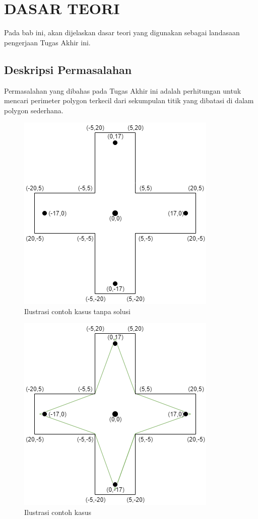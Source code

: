\chapter {DASAR TEORI}

Pada bab ini, akan dijelaskan dasar teori yang digunakan sebagai landasaan pengerjaan Tugas Akhir ini.

\section{ Deskripsi Permasalahan}
Permasalahan yang dibahas pada Tugas Akhir ini adalah perhitungan untuk mencari perimeter polygon terkecil dari sekumpulan titik yang dibatasi di dalam polygon sederhana.
\begin{figure}
	\Centering
	\includegraphics [width=0.5\columnwidth]{bab2/img/contoh-kasus-tanpa-solusi}
	\caption {Ilustrasi contoh kasus tanpa solusi}
	\label {fig:ilustrasi-contoh-kasus-tanpa-solusi}
\end{figure}
\begin{figure}
	\Centering
	\includegraphics [width=0.5\columnwidth]{bab2/img/contoh-kasus}
	\caption {Ilustrasi contoh kasus}
	\label {fig:ilustrasi-contoh-kasus}
\end{figure}


